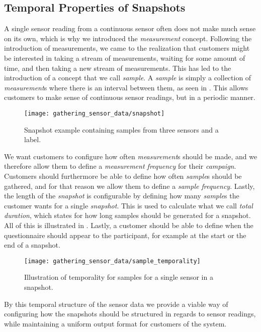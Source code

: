 \subsection{Temporal Properties of Snapshots}
\label{sec:temporal_properties_of_snapshots}

A single sensor reading from a continuous sensor often does not make much sense on its own, which is why we introduced the \emph{measurement} concept. Following the introduction of measurements, we came to the realization that customers might be interested in taking a stream of measurements, waiting for some amount of time, and then taking a new stream of measurements. This has led to the introduction of a concept that we call \emph{sample}. A \emph{sample} is simply a collection of \emph{measurement}s where there is an interval between them, as seen in . This allows customers to make sense of continuous sensor readings, but in a periodic manner. 

\begin{figure}[!htbp]
    \centering
    \texttt{[image: gathering\_sensor\_data/snapshot]}
    \caption{Snapshot example containing samples from three sensors and a label.}
    \label{fig:snapshot_example_with_samples}
\end{figure}
\FloatBarrier

We want customers to configure how often \emph{measurement}s should be made, and we therefore allow them to define a \emph{measurement frequency} for their \emph{campaign}. Customers should furthermore be able to define how often \emph{sample}s should be gathered, and for that reason we allow them to define a \emph{sample frequency}. Lastly, the length of the \emph{snapshot} is configurable by defining how many \emph{sample}s the customer wants for a single \emph{snapshot}. This is used to calculate what we call \emph{total duration}, which states for how long samples should be generated for a snapshot. All of this is illustrated in . Lastly, a customer should be able to define when the questionnaire should appear to the participant, for example at the start or the end of a snapshot.

\begin{figure}[!htbp]
    \centering
    \texttt{[image: gathering\_sensor\_data/sample\_temporality]}
    \caption{Illustration of temporality for samples for a single sensor in a snapshot.}
    \label{fig:sample_temporality}
\end{figure}
\FloatBarrier

By this temporal structure of the sensor data we provide a viable way of configuring how the snapshots should be structured in regards to sensor readings, while maintaining a uniform output format for customers of the system.
